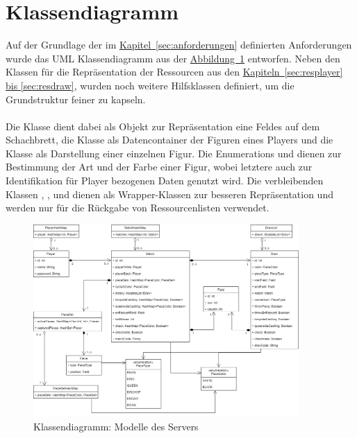 \section{Klassendiagramm}
Auf der Grundlage der im \hyperref[sec:anforderungen]{Kapitel~\ref{sec:anforderungen}} definierten Anforderungen wurde das \gls{UML} Klassendiagramm aus der \hyperref[fig:classdiagram]{Abbildung~\ref{fig:classdiagram}} entworfen. Neben den Klassen für die Repräsentation der Ressourcen aus den \hyperref[sec:resplayer, sec:resdraw]{Kapiteln~\ref{sec:resplayer} bis \ref{sec:resdraw}}, wurden noch weitere Hilfsklassen definiert, um die Grundstruktur feiner zu kapseln.\\
\\
Die Klasse  dient dabei als Objekt zur Repräsentation eine Feldes auf dem Schachbrett, die Klasse  als Datencontainer der Figuren eines Players und die Klasse  als Darstellung einer einzelnen Figur. Die Enumerations  und  dienen zur Bestimmung der Art und der Farbe einer Figur, wobei letztere auch zur Identifikation für Player bezogenen Daten genutzt wird. Die verbleibenden Klassen , ,  und  dienen als Wrapper-Klassen zur besseren Repräsentation und werden nur für die Rückgabe von Ressourcenlisten verwendet.
\begin{figure}
	\includegraphics[width=0.9\textwidth]{images/classdiagram.png}
	\caption{Klassendiagramm: Modelle des Servers}
	\label{fig:classdiagram}
\end{figure}

